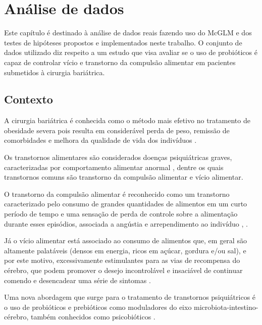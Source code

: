 
\chapter{Análise de dados}\label{cap:aplicacao}


Este capítulo é destinado à análise de dados reais fazendo uso do McGLM e dos testes de hipóteses propostos e implementados neste trabalho. O conjunto de dados utilizado diz respeito a um estudo que visa avaliar se o uso de probióticos é capaz de controlar vício e transtorno da compulsão alimentar em pacientes submetidos à cirurgia bariátrica.


\section{Contexto}

A cirurgia bariátrica é conhecida como o método mais efetivo no tratamento de obesidade severa pois resulta em considerável perda de peso, remissão de comorbidades e melhora da qualidade de vida dos indivíduos \citep{mechanick2020clinical}.

Os transtornos alimentares são considerados doenças psiquiátricas graves, caracterizadas por comportamento alimentar anormal \citep{treasure2020eating}, dentre os quais transtornos comuns são transtorno da compulsão alimentar e vício alimentar.

O transtorno da compulsão alimentar é reconhecido como um transtorno caracterizado pelo consumo de grandes quantidades de alimentos em um curto período de tempo e uma sensação de perda de controle sobre a alimentação durante esses episódios, associada a angústia e arrependimento ao indivíduo \citep{sarmiento2020diagnostic}, \citep{wilfley2016characteristics}.

Já o vício alimentar está associado ao consumo de alimentos que, em geral são altamente palatáveis (densos em energia, ricos em açúcar, gordura e/ou sal), e por este motivo, excessivamente estimulantes para as vias de recompensa do cérebro, que podem promover o desejo incontrolável e insaciável de continuar comendo e desencadear uma série de sintomas \citep{avena2012further, najem2020prevalence}.

Uma nova abordagem que surge para o tratamento de transtornos psiquiátricos é o uso de probióticos e prebióticos como moduladores do eixo microbiota-intestino-cérebro, também conhecidos como psicobióticos \citep{dinan2013psychobiotics, mason2017feeding, misra2019psychobiotics}.

